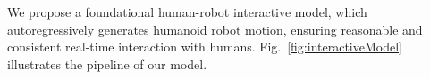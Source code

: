 


We propose a foundational human-robot interactive model, which autoregressively generates humanoid robot motion, ensuring reasonable and consistent real-time interaction with humans. Fig.~\ref{fig:interactiveModel} illustrates the pipeline of our model.



